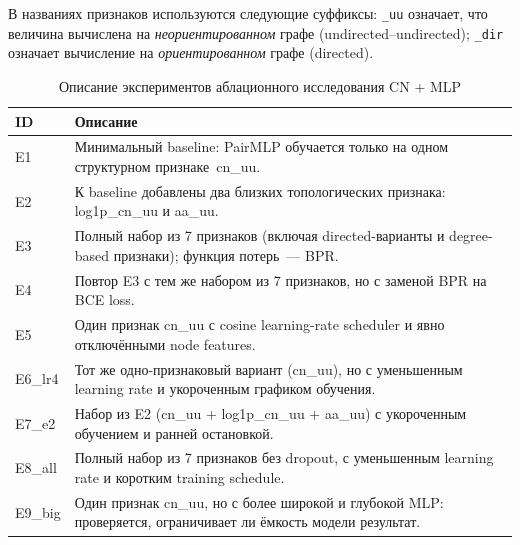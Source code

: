 \documentclass[a4paper,12pt]{extarticle}
\begin{document}
В названиях признаков используются следующие суффиксы: \texttt{\_uu} означает, что величина вычислена на \textit{неориентированном} графе (undirected--undirected); \texttt{\_dir} означает вычисление на \textit{ориентированном} графе (directed).

\begin{table}[ht]
	\caption{Описание экспериментов аблационного исследования CN + MLP}
	\label{table:ablation_desc}
	\footnotesize
	\centering
	\begin{tabular}{lp{}}
		\toprule
		ID & Описание \\
		\midrule
		E1      & Минимальный baseline: PairMLP обучается только на одном структурном признаке~cn\_uu. \\
		E2      & К baseline добавлены два близких топологических признака: log1p\_cn\_uu и aa\_uu. \\
		E3      & Полный набор из 7 признаков (включая directed-варианты и degree-based признаки); функция потерь~--- BPR. \\
		E4      & Повтор E3 с тем же набором из 7 признаков, но с заменой BPR на BCE loss. \\
		E5      & Один признак cn\_uu с cosine learning-rate scheduler и явно отключёнными node features. \\
		E6\_lr4 & Тот же одно-признаковый вариант (cn\_uu), но с уменьшенным learning rate и укороченным графиком обучения. \\
		E7\_e2  & Набор из E2 (cn\_uu + log1p\_cn\_uu + aa\_uu) с укороченным обучением и ранней остановкой. \\
		E8\_all & Полный набор из 7 признаков без dropout, с уменьшенным learning rate и коротким training schedule. \\
		E9\_big & Один признак cn\_uu, но с более широкой и глубокой MLP: проверяется, ограничивает ли ёмкость модели результат. \\
		\bottomrule
	\end{tabular}
\end{table}
\end{document}

